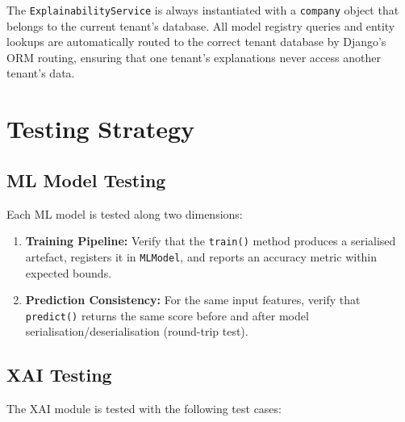 \documentclass[12pt,a4paper]{report}
\begin{document}
The \texttt{ExplainabilityService} is always instantiated with a \texttt{company} object that belongs to the current tenant's database. All model registry queries and entity lookups are automatically routed to the correct tenant database by Django's ORM routing, ensuring that one tenant's explanations never access another tenant's data.

\section{Testing Strategy}
\label{sec:testing}

\subsection{ML Model Testing}

Each ML model is tested along two dimensions:

\begin{enumerate}[label=\arabic*.]
  \item \textbf{Training Pipeline:} Verify that the \texttt{train()} method produces a serialised artefact, registers it in \texttt{MLModel}, and reports an accuracy metric within expected bounds.

  \item \textbf{Prediction Consistency:} For the same input features, verify that \texttt{predict()} returns the same score before and after model serialisation/deserialisation (round-trip test).
\end{enumerate}

\subsection{XAI Testing}

The XAI module is tested with the following test cases:
\end{document}
